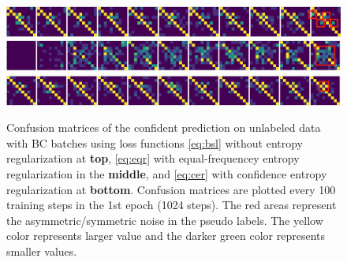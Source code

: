 \begin{figure}[h]
\centering
\includegraphics[width=14cm]{../openreview/fig/eta0.png}\\
\includegraphics[width=14cm]{../openreview/fig/2eta005.png}\\
\includegraphics[width=14cm]{../openreview/fig/eta005.png}
\caption{Confusion matrices of the confident prediction on unlabeled data with BC batches using loss functions \eqref{eq:bsl} without entropy regularization at \textbf{top}, 
\eqref{eq:eqr} with equal-frequencey entropy regularization in the \textbf{middle},
and \eqref{eq:cer} with confidence entropy regularization at \textbf{bottom}. Confusion matrices are plotted every 100 training steps in the 1st epoch (1024 steps). The red areas represent the asymmetric/symmetric noise in the pseudo labels. The yellow color represents larger value and the darker green color represents smaller values.
}\label{fig:cfmx_eta}
\end{figure}


